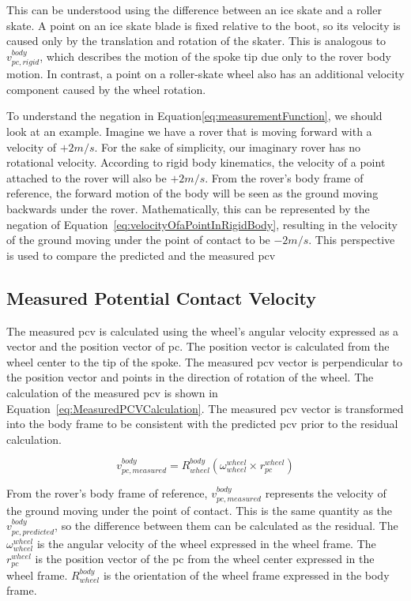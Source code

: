 \documentclass[report.tex]{subfiles}
\begin{document}
    This can be understood using the difference between an ice skate and a roller skate. A point on an ice skate blade is fixed relative to the boot, so its velocity is caused only by the translation and rotation of the skater. This is analogous to $v_{pc, rigid}^{body}$, which describes the motion of the spoke tip due only to the rover body motion. In contrast, a point on a roller-skate wheel also has an additional velocity component caused by the wheel rotation.
    
    To understand the negation in Equation\ref{eq:measurementFunction}, we should look at an example. Imagine we have a rover that is moving forward with a velocity of $+2 m/s$. For the sake of simplicity, our imaginary rover has no rotational velocity. According to rigid body kinematics, the velocity of a point attached to the rover will also be $+2 m/s$. From the rover's body frame of reference, the forward motion of the body will be seen as the ground moving backwards under the rover. Mathematically, this can be represented by the negation of Equation~\ref{eq:velocityOfaPointInRigidBody}, resulting in the velocity of the ground moving under the point of contact to be $-2 m/s$. This perspective is used to compare the predicted and the measured \gls{pcv}
        
    \subsection{Measured Potential Contact Velocity} \label{subsec:measuredPCV}
    
    The measured \gls{pcv} is calculated using the wheel's angular velocity expressed as a vector and the position vector of \gls{pc}. The position vector is calculated from the wheel center to the tip of the spoke. The measured \gls{pcv} vector is perpendicular to the position vector and points in the direction of rotation of the wheel. The calculation of the measured \gls{pcv} is shown in Equation~\ref{eq:MeasuredPCVCalculation}. The measured \gls{pcv} vector is transformed into the body frame to be consistent with the predicted \gls{pcv} prior to the residual calculation.
    
    \begin{equation}
        v_{pc, measured}^{body} = R_{wheel}^{body} (\omega_{wheel}^{wheel} \times {}^{}r_{pc}^{wheel})
        \label{eq:MeasuredPCVCalculation}
    \end{equation}

    From the rover's body frame of reference, $v_{pc, measured}^{body}$ represents the velocity of the ground moving under the point of contact. This is the same quantity as the $v_{pc, predicted}^{body}$, so the difference between them can be calculated as the residual. The $\omega_{wheel}^{wheel}$ is the angular velocity of the wheel expressed in the wheel frame. The $r_{pc}^{wheel}$ is the position vector of the \gls{pc} from the wheel center expressed in the wheel frame. $R_{wheel}^{body}$ is the orientation of the wheel frame expressed in the body frame.
      
\end{document}
